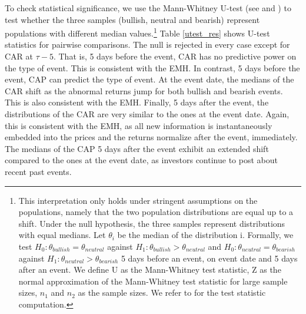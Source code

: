 \clearpage
To check statistical significance, we use the Mann-Whitney U-test (see \citet{utest} and \citet{sheskin}) to test whether the three samples (bullish, neutral and bearish) represent populations with different median values.\footnote{This interpretation only holds under stringent assumptions on the populations, namely that the two population distributions are equal up to a shift. Under the null hypothesis, the three samples represent distributions with equal medians. Let $\theta_i$ be the median of the distribution i. Formally, we test $H_0 : \theta_{bullish} = \theta_{neutral}$ against $H_1 : \theta_{bullish} > \theta_{neutral}$ and $H_0 : \theta_{neutral} = \theta_{bearish}$ against $H_1 : \theta_{neutral} > \theta_{bearish}$ 5 days before an event, on event date and 5 days after an event. We define U as the Mann-Whitney test statistic, Z as the normal approximation of the Mann-Whitney test statistic for large sample sizes, $n_1$ and $n_2$ as the sample sizes. We refer to \citet{sheskin} for the test statistic computation.}
Table \ref{utest_res} shows U-test statistics for pairwise comparisons. The null is rejected in every case except for CAR at $\tau-5$. That is, 5 days before the event, CAR has no predictive power on the type of event. This is consistent with the EMH. In contrast, 5 days before the event, CAP can predict the type of event. At the event date, the medians of the CAR shift as the abnormal returns jump for both bullish and bearish events. This is also consistent with the EMH. Finally, 5 days after the event, the distributions of the CAR are very similar to the ones at the event date. Again, this is consistent with the EMH, as all new information is instantaneously embedded into the prices and the returns normalize after the event, immediately. The medians of the CAP 5 days after the event exhibit an extended shift compared to the ones at the event date, as investors continue to post about recent past events.







